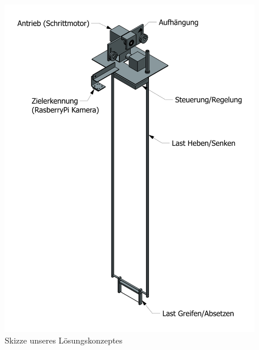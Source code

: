 \documentclass[a4paper]{report}
\begin{document}
\begin{figure}[h!]
	\centering
	\includegraphics[height=0.5\textheight,keepaspectratio]{marku_103000_bg-00_ze1}
	\caption{Skizze unseres Lösungskonzeptes}
	\label{fig:LoesungsKonzept}
\end{figure}

\newpage
\end{document}
